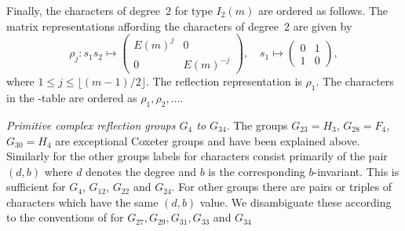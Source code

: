 Finally,  the characters  of degree~$2$  for type  $I_2(m)$ are  ordered as
follows.  The matrix representations affording the characters of degree~$2$
are given by\:
$$ \rho_j \colon s_1s_2 \mapsto
\left(\begin{array}{cc}E(m)^j&0\\0&E(m)^{-j}\end{array}\right),
\quad s_1\mapsto\left(\begin{array}{cc}0&1\\1&0\end{array}\right),$$
where  $1 \le j \le  \lfloor (m-1)/2\rfloor$. The reflection representation
is   $\rho_1$.  The  characters   in  the  \CHEVIE-table   are  ordered  as
$\rho_1,\rho_2,\ldots$.

\smallskip
{\em Primitive complex reflection groups $G_4$ to $G_{34}$}.
The groups $G_{23}=H_3$, $G_{28}=F_4$, $G_{30}=H_4$ are exceptional Coxeter
groups and have been explained above. Similarly for the other groups labels
for  characters consist primarily of the pair $(d,b)$ where $d$ denotes the
degree  and $b$ is the corresponding  $b$-invariant. This is sufficient for
$G_4$, $G_{12}$, $G_{22}$ and $G_{24}$. For other groups there are pairs or
triples  of characters which  have the same  $(d,b)$ value. We disambiguate
these  according to  the conventions  of \cite{Mal00}  for $G_{27}, G_{29},
G_{31}, G_{33}$ and $G_{34}$\:

